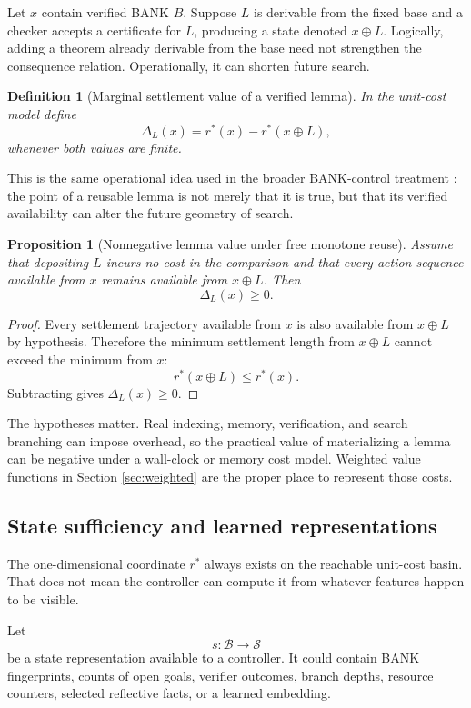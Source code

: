 \documentclass[11pt,letterpaper]{article}
\newtheorem{proposition}[theorem]{Proposition}
\newtheorem{definition}[theorem]{Definition}
\theoremstyle{remark}
\newcommand{\Basin}{\mathcal B}
\newcommand{\rstar}{r^{\!*}}
\begin{document}
Let $x$ contain verified BANK $B$. Suppose $L$ is derivable from the fixed base and a checker accepts a certificate for $L$, producing a state denoted $x\oplus L$. Logically, adding a theorem already derivable from the base need not strengthen the consequence relation. Operationally, it can shorten future search.

\begin{definition}[Marginal settlement value of a verified lemma]
In the unit-cost model define
\[
\Delta_L(x)=\rstar(x)-\rstar(x\oplus L),
\]
whenever both values are finite.
\end{definition}

This is the same operational idea used in the broader BANK-control treatment \cite{VSS}: the point of a reusable lemma is not merely that it is true, but that its verified availability can alter the future geometry of search.

\begin{proposition}[Nonnegative lemma value under free monotone reuse]\label{prop:lemmavalue}
Assume that depositing $L$ incurs no cost in the comparison and that every action sequence available from $x$ remains available from $x\oplus L$. Then
\[
\Delta_L(x)\ge0.
\]
\end{proposition}

\begin{proof}
Every settlement trajectory available from $x$ is also available from $x\oplus L$ by hypothesis. Therefore the minimum settlement length from $x\oplus L$ cannot exceed the minimum from $x$:
\[
\rstar(x\oplus L)\le\rstar(x).
\]
Subtracting gives $\Delta_L(x)\ge0$.
\end{proof}

The hypotheses matter. Real indexing, memory, verification, and search branching can impose overhead, so the practical value of materializing a lemma can be negative under a wall-clock or memory cost model. Weighted value functions in Section \ref{sec:weighted} are the proper place to represent those costs.

\subsection{State sufficiency and learned representations}

The one-dimensional coordinate $\rstar$ always exists on the reachable unit-cost basin. That does not mean the controller can compute it from whatever features happen to be visible.

Let
\[
s:\Basin\to\mathcal S
\]
be a state representation available to a controller. It could contain BANK fingerprints, counts of open goals, verifier outcomes, branch depths, resource counters, selected reflective facts, or a learned embedding.
\end{document}
